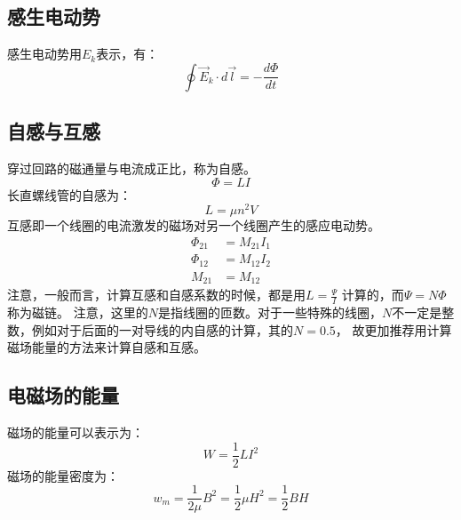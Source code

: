 \documentclass{ctexart}
\begin{document}
\subsection{感生电动势}
感生电动势用$E_k$表示，有：
$$
    \oint \vec{E}_k \cdot d\vec{l} = -\frac{d\Phi}{dt}
$$
\subsection{自感与互感}
穿过回路的磁通量与电流成正比，称为自感。
$$
    \varPhi = LI
$$
长直螺线管的自感为：
$$
    L = \mu n^2 V
$$
互感即一个线圈的电流激发的磁场对另一个线圈产生的感应电动势。
\begin{align*}
    \varPhi_{21} &= M_{21}I_1 \\
    \varPhi_{12} &= M_{12}I_2 \\
    M_{21} &= M_{12}
\end{align*}
注意，一般而言，计算互感和自感系数的时候，都是用$L = \frac{\varPsi}{I}$ 计算的，而$\varPsi = N \Phi$ 称为磁链。
注意，这里的$N$是指线圈的匝数。对于一些特殊的线圈，$N$不一定是整数，例如对于后面的一对导线的内自感的计算，其的$N=0.5$，
故更加推荐用计算磁场能量的方法来计算自感和互感。
\subsection{电磁场的能量}
磁场的能量可以表示为：
$$
    W = \frac{1}{2} LI^2
$$
磁场的能量密度为：
$$
    w_m =  \frac{1}{2\mu} B^2 = \frac{1}{2}\mu H^2 = \frac{1}{2} BH
$$
\end{document}
